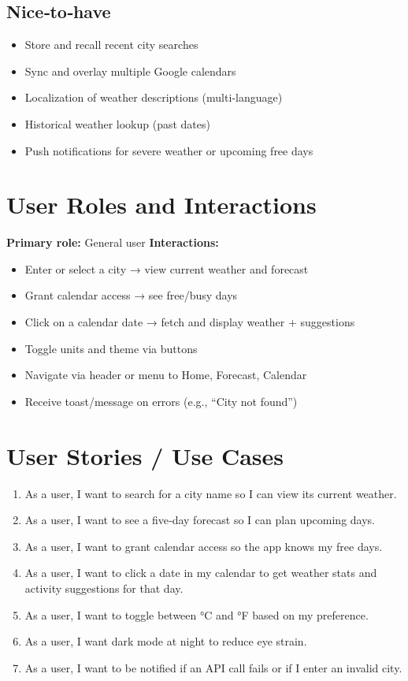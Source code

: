 \documentclass[11pt,a4paper]{article}
\begin{document}
\subsection*{Nice‑to‑have}
\begin{itemize}[nosep]
  \item Store and recall recent city searches
  \item Sync and overlay multiple Google calendars
  \item Localization of weather descriptions (multi‑language)
  \item Historical weather lookup (past dates)
  \item Push notifications for severe weather or upcoming free days
\end{itemize}

\section{User Roles and Interactions}
\textbf{Primary role:} General user  
\textbf{Interactions:}
\begin{itemize}[nosep]
  \item Enter or select a city → view current weather and forecast
  \item Grant calendar access → see free/busy days
  \item Click on a calendar date → fetch and display weather + suggestions
  \item Toggle units and theme via buttons
  \item Navigate via header or menu to Home, Forecast, Calendar
  \item Receive toast/message on errors (e.g., “City not found”)
\end{itemize}

\section{User Stories / Use Cases}
\begin{enumerate}[nosep]
  \item As a user, I want to search for a city name so I can view its current weather.
  \item As a user, I want to see a five‑day forecast so I can plan upcoming days.
  \item As a user, I want to grant calendar access so the app knows my free days.
  \item As a user, I want to click a date in my calendar to get weather stats and activity suggestions for that day.
  \item As a user, I want to toggle between °C and °F based on my preference.
  \item As a user, I want dark mode at night to reduce eye strain.
  \item As a user, I want to be notified if an API call fails or if I enter an invalid city.
\end{enumerate}
\end{document}
